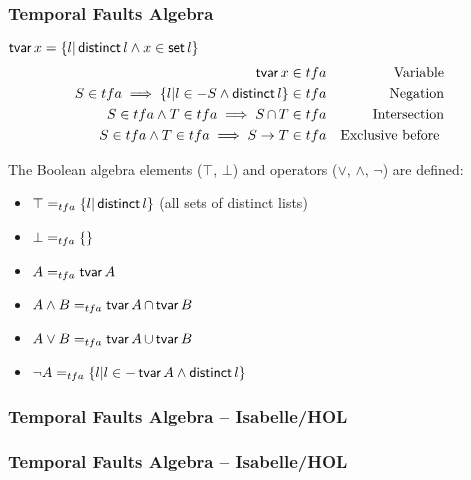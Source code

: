 \begin{frame}
\frametitle{Temporal Faults Algebra}

$\operatorname{\mathsf{tvar}} x = \{l | \operatorname{\mathsf{distinct}} l \land x \in \operatorname{\mathsf{set}} l\}$
%
\begin{subequations}
\begin{align}
%
\tvar x &\in \tfa & \text{Variable}\\
%
S \in \tfa \implies \{ l | l \in -S \land \distinct l\} &\in \tfa & \text{Negation}\\
%
S \in \tfa \land T \in \tfa \implies 
S \inter T &\in \tfa & \text{Intersection} \\
%
S \in \tfa \land T \in \tfa \implies 
S \rightarrow T & \in \tfa & \text{Exclusive before }
%
\end{align} %
%
\end{subequations}%

The Boolean algebra elements ($\top$, $\bot$) and operators ($\lor$, $\land$, $\lnot$) are defined:
\begin{itemize}
  \item $\top =_{tfa} \{l | \operatorname{\mathsf{distinct}} l\}$ (all sets of distinct lists)
  \item $\bot =_{tfa} \{\}$
  \item $A =_{tfa} \operatorname{\mathsf{tvar}} A $
  \item $A \land B =_{tfa} \operatorname{\mathsf{tvar}} A \operatorname{\cap} \operatorname{\mathsf{tvar}} B$
  \item $A \lor B =_{tfa} \operatorname{\mathsf{tvar}} A \operatorname{\cup} \operatorname{\mathsf{tvar}} B$
  \item $\lnot A =_{tfa} \{l | l \in - \operatorname{\mathsf{tvar}} A \land \operatorname{\mathsf{distinct}} l\}$
\end{itemize}
\end{frame}

\begin{frame}
\frametitle{Temporal Faults Algebra -- Isabelle/HOL}

\end{frame}

\begin{frame}
\frametitle{Temporal Faults Algebra -- Isabelle/HOL}
\end{frame}

